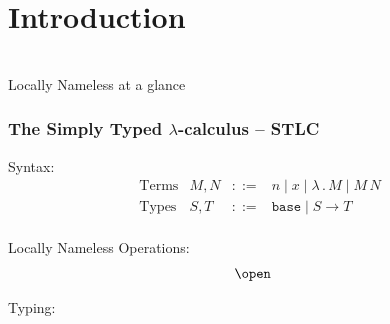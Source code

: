 \section{Introduction}

\begin{frame}
  \vfill
  \centering
  \begin{sticky}
     \\
    {\normalfont\Large Locally Nameless at a glance} \par%
  \end{sticky}
  \vfill
\end{frame}

\newcommand{\bvar}[1]{\ensuremath{#1}}
\newcommand{\fvar}[1]{\ensuremath{#1}}
\newcommand{\lam}[1]{\ensuremath{\lambda\mathrel{.}{#1}}}
\newcommand{\app}[2]{\ensuremath{{#1}\,{#2}}}
\newcommand{\base}[0]{\ensuremath{\texttt{base}}}
\newcommand{\arr}[2]{\ensuremath{{#1}\to{#2}}}

\newcommand{\loft}[3]{\ensuremath{{#1}\mathrel{\vdash}{#2}\mathrel{:}{#3}}}

\begin{frame}
  \frametitle{The Simply Typed $\lambda$-calculus -- STLC}
  \begin{block}{Syntax:}
    \begin{displaymath}
      \begin{array}{rrcl}
        \text{Terms} & M, N & \mathrel{::=} & \bvar n \mid \fvar x \mid \lam M \mid \app M N\\
        \text{Types} & S, T & \mathrel{::=} & \base \mid \arr S T\\
      \end{array}
    \end{displaymath}

  \end{block}
  \begin{block}{Locally Nameless Operations:}
    \begin{displaymath}
      \begin{array}{cc}
        \open &
      \end{array}
    \end{displaymath}
  \end{block}
  \begin{block}{Typing:}
    \end{block}

\end{frame}

